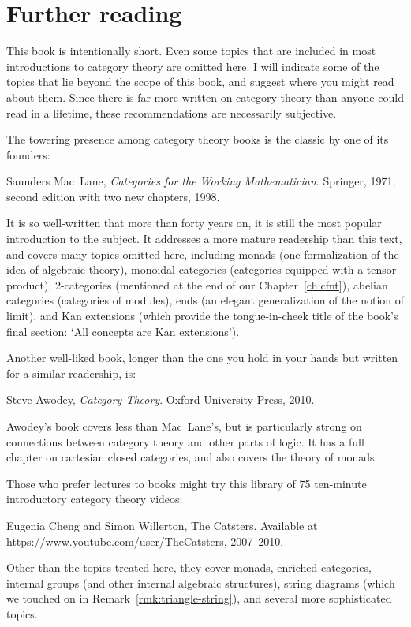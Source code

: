 % 
% 
% 

\chapter*{Further reading}


This book is intentionally short.  Even some topics that are included in
most introductions to category theory are omitted here.  I will indicate
some of the topics that lie beyond the scope of this book, and suggest
where you might read about them.  Since there is far more written on
category theory than anyone could read in a lifetime, these recommendations
are necessarily subjective.

The towering presence among category theory books is the classic by
one of its founders:
% 
\begin{citedsource}
Saunders Mac~Lane,
\emph{Categories for the Working Mathematician}.\linebreak
Springer, 
1971;
second edition with two new chapters, 
1998.
\end{citedsource}
% 
It is so well-written that more than forty years on, it is still the most
popular introduction to the subject.  It addresses a more mature readership
than this text, and covers many topics omitted here, including monads (one
formalization of the idea of algebraic theory), monoidal categories
(categories equipped with a tensor product), 2-categories (mentioned at the
end of our Chapter~\ref{ch:cfnt}), abelian categories (categories of
modules), ends (an elegant generalization of the notion of limit), and Kan
extensions (which provide the tongue-in-cheek title of the book's final
section: `All concepts are Kan extensions').

Another well-liked book, longer than the one you hold in your hands but
written for a similar readership, is:
% 
\begin{citedsource}
Steve Awodey,
\emph{Category Theory}.
Oxford University Press, 
2010.
\end{citedsource}
% 
Awodey's book covers less than Mac~Lane's, but is particularly strong on
connections between category theory and other parts of logic.  It has a
full chapter on cartesian closed categories, and also covers the theory of
monads.

Those who prefer lectures to books might try this library of 75 ten-minute
introductory category theory videos:
% 
\begin{citedsource}
Eugenia Cheng and Simon Willerton,
The Catsters.
Available at\linebreak
\href{https://www.youtube.com/user/TheCatsters}{\url{https://www.youtube.com/user/TheCatsters}}, 
2007--2010.
\end{citedsource}
% 
Other than the topics treated here, they cover monads, enriched categories,
internal groups (and other internal algebraic structures), string diagrams
(which we touched on in Remark~\ref{rmk:triangle-string}), and several more
sophisticated topics.

